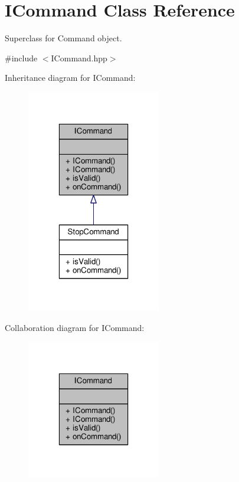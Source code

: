 \hypertarget{class_i_command}{\section{I\-Command Class Reference}
\label{class_i_command}
}


Superclass for Command object.  




{\ttfamily \#include $<$I\-Command.\-hpp$>$}



Inheritance diagram for I\-Command\-:
\nopagebreak
\begin{figure}[H]
\begin{center}
\leavevmode
\includegraphics[width=166pt]{class_i_command__inherit__graph}
\end{center}
\end{figure}


Collaboration diagram for I\-Command\-:
\nopagebreak
\begin{figure}[H]
\begin{center}
\leavevmode
\includegraphics[width=166pt]{class_i_command__coll__graph}
\end{center}
\end{figure}
